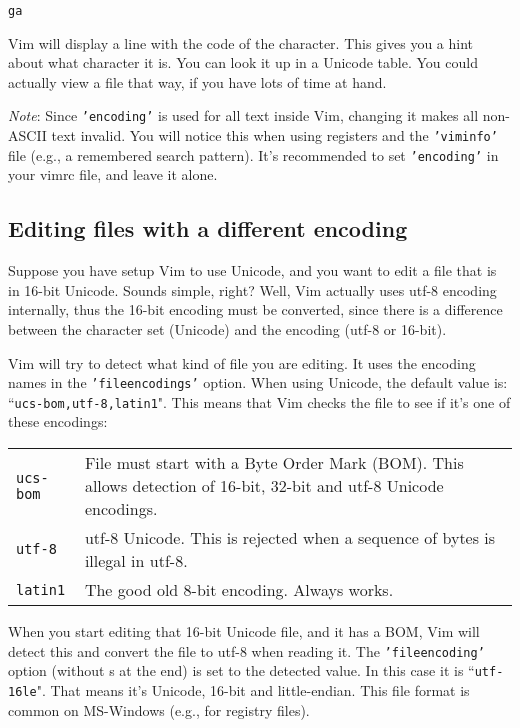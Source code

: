 \begin{Verbatim}[samepage=true]
 ga
\end{Verbatim}

Vim will display a line with the code of the character.
This gives you a hint about what character it is.
You can look it up in a Unicode table.
You could actually view a file that way, if you have lots of time at hand.

\emph{Note}:
Since \texttt{'encoding'} is used for all text inside Vim, changing it makes all non-ASCII text invalid.
You will notice this when using registers and the \texttt{'viminfo'} file (e.g., a remembered search pattern).
It's recommended to set \texttt{'encoding'} in your vimrc file, and leave it alone.
\subsection{Editing files with a different encoding}
Suppose you have setup Vim to use Unicode, and you want to edit a file that is in 16-bit Unicode.
Sounds simple, right?  Well, Vim actually uses utf-8 encoding internally, thus the 16-bit encoding must be converted, since there is a difference between the character set (Unicode) and the encoding (utf-8 or 16-bit).

Vim will try to detect what kind of file you are editing.
It uses the encoding names in the \texttt{'fileencodings'} option.
When using Unicode, the default value is: ``\texttt{ucs-bom,utf-8,latin1}".
This means that Vim checks the file to see if it's one of these encodings:

\begin{center} \begin{tabularx}{\textwidth}{l X}
				\texttt{ucs-bom} & File must start with a Byte Order Mark (BOM).  This allows detection of 16-bit, 32-bit and utf-8 Unicode encodings. \\
				\texttt{utf-8} & utf-8 Unicode.  This is rejected when a sequence of bytes is illegal in utf-8. \\
				\texttt{latin1} & The good old 8-bit encoding.  Always works. \\
\end{tabularx} \end{center}
When you start editing that 16-bit Unicode file, and it has a BOM, Vim will detect this and convert the file to utf-8 when reading it.
The \texttt{'fileencoding'} option (without s at the end) is set to the detected value.
In this case it is ``\texttt{utf-16le}".
That means it's Unicode, 16-bit and little-endian.
This file format is common on MS-Windows (e.g., for registry files).

